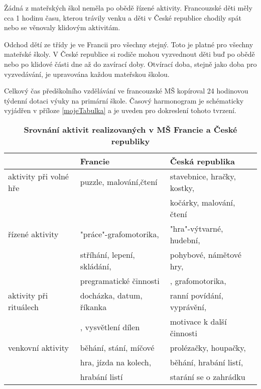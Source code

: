 	Žádná z mateřských škol neměla po obědě řízené aktivity. Francouzské děti měly cca 1 hodinu času, kterou trávily venku a děti v České republice chodily spát nebo se věnovaly klidovým aktivitám. 

	Odchod dětí ze třídy je ve Francii pro všechny stejný. Toto je platné pro všechny mateřské školy. V České republice si rodiče mohou vyzvednout děti buď po obědě nebo po klidové části dne až do zavírací doby. Otvírací doba, stejně jako doba pro vyzvedávání, je upravována každou mateřskou školou.

	Celkový čas předškolního vzdělávání ve francouzské MŠ kopíroval 24 hodinovou týdenní dotaci výuky na primární škole. Časový harmonogram je schématicky vyjádřen v příloze \ref{mojeTabulka}
	a je uveden pro dokreslení tohoto tvrzení.


\begin{table}[h]
	
	\begin{tabular}{|l|l|l|}
	\hline
	\rowcolor{grey}
								& \textbf{Francie}				& \textbf{Česká republika}	\\
	\hline
	\hline
\rowcolor{grey!10}	 aktivity při volné hře	&puzzle, malování,čtení 	&stavebnice, hračky, kostky,\\ 
\rowcolor{grey!10}	 						&							&kočárky, malování, čtení \\ 
\rowcolor{grey!50}	 řízené aktivity  		&"práce"-grafomotorika, 	&"hra"-výtvarné, hudební, \\ 
\rowcolor{grey!50}	 						&stříhání, lepení, skládání,&pohybové, námětové hry, \\ 
\rowcolor{grey!50}	 						&pregramatické činnosti 	&, grafomotorika, \\
\rowcolor{grey!10}	 aktivity při rituálech &docházka, datum, říkanka 	&ranní povídání, vyprávění,\\ 
\rowcolor{grey!10}	 						&, vysvětlení dílen			& motivace k další činnosti\\ 
\rowcolor{grey!50}   venkovní aktivity 		& běhání, stání, míčové		& prolézačky, houpačky, \\
\rowcolor{grey!50}							&hra, jízda na kolech, 		&běhání, hrabání listí,	\\
\rowcolor{grey!50}							&hrabání listí				&starání se o zahrádku	\\
	 \hline
	\end{tabular}
	
	\caption{ \textbf{Srovnání aktivit realizovaných v MŠ Francie a České republiky}
	}
	\label{srovnaniaktivit}
\end{table}

